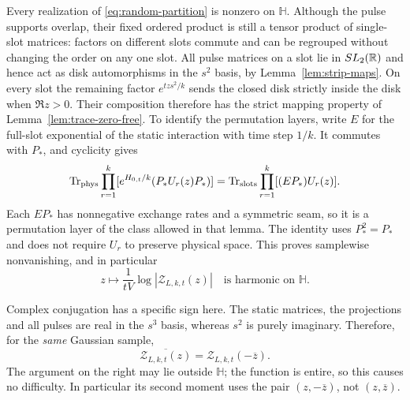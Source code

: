 Every realization of \eqref{eq:random-partition} is nonzero on
$\mathbb H$.  Although the pulse supports overlap, their fixed ordered
product is still a tensor product of single-slot matrices: factors on
different slots commute and can be regrouped without changing the
order on any one slot.  All pulse matrices on a slot lie in
$SL_2(\mathbb R)$ and hence act as disk automorphisms in the $s^2$ basis, by
Lemma~\ref{lem:strip-maps}.  On every slot the remaining factor $e^{tzs^2/k}$ sends the
closed disk strictly inside the disk when $\Re z>0$.  Their composition
therefore has the strict mapping property of
Lemma~\ref{lem:trace-zero-free}.  To identify the permutation layers,
write $E$ for the full-slot exponential of the static interaction
with time step $1/k$.  It commutes with $P_*$, and cyclicity gives
\[
 \operatorname{Tr}_{\rm phys}\prod_{r=1}^k
       [e^{H_{0,t}/k}(P_*U_r(z)P_*)]
      =\operatorname{Tr}_{\rm slots}\prod_{r=1}^k[(EP_*)U_r(z)].
\]
Each $EP_*$ has nonnegative exchange rates and a symmetric seam, so
it is a permutation layer of the class allowed in that lemma.  The
identity uses $P_*^2=P_*$ and does not require $U_r$ to preserve
physical space.  This proves
samplewise nonvanishing, and in particular
\begin{equation}
 z\longmapsto\frac{1}{tV}\log|\mathcal Z_{L,k,t}(z)|
 \quad\text{is harmonic on }\mathbb H.
 \label{eq:sample-harmonic}
\end{equation}

Complex conjugation has a specific sign here.  The static matrices,
the projections and all pulses are real in the $s^3$ basis, whereas
$s^2$ is purely imaginary.  Therefore, for the \emph{same} Gaussian
sample,
\begin{equation}
 \overline{\mathcal Z_{L,k,t}(z)}
       =\mathcal Z_{L,k,t}(-\overline z).
 \label{eq:sample-conjugation}
\end{equation}
The argument on the right may lie outside $\mathbb H$; the function is
entire, so this causes no difficulty.  In particular its second moment
uses the pair $(z,-\overline z)$, not $(z,\overline z)$.

